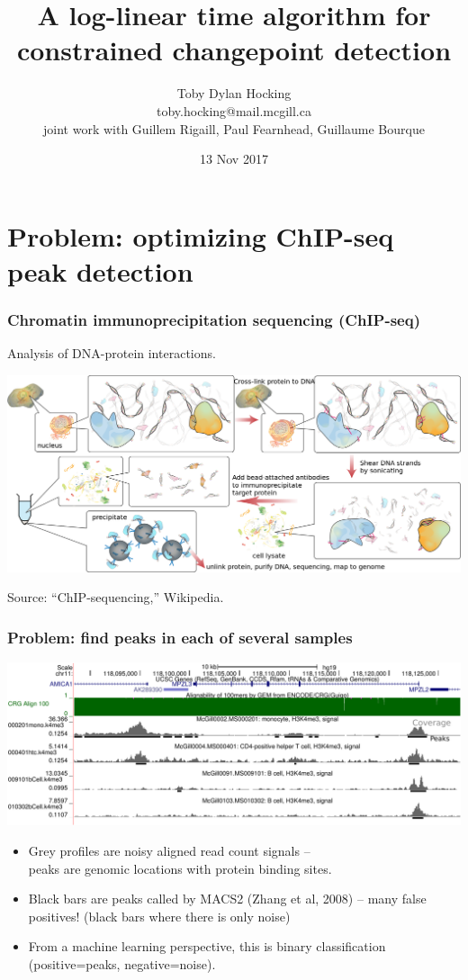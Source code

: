 \documentclass{beamer}
\begin{document}
\title{A log-linear time algorithm for constrained 
changepoint detection
}

\author{
  Toby Dylan Hocking\\
  toby.hocking@mail.mcgill.ca\\
  joint work with Guillem Rigaill, Paul Fearnhead, 
  Guillaume Bourque}

\date{13 Nov 2017}

\maketitle

\section{Problem: optimizing ChIP-seq peak detection}

\begin{frame}
  \frametitle{Chromatin immunoprecipitation sequencing (ChIP-seq)}
  Analysis of DNA-protein interactions.

  \includegraphics[width=\textwidth]{Chromatin_immunoprecipitation_sequencing_wide.png}

  Source: ``ChIP-sequencing,'' Wikipedia.
\end{frame}

\begin{frame}
  \frametitle{Problem: find peaks in each of several samples}
  \includegraphics[width=\textwidth]{screenshot-ucsc-edited}

  \begin{itemize}
  \item Grey profiles are noisy aligned read count signals -- \\peaks
    are genomic locations with protein binding sites.
  \item Black bars are peaks called by MACS2 (Zhang et al, 2008) -- many
    false positives! (black bars where there is only noise)
  \item From a machine learning perspective, this is binary
    classification (positive=peaks, negative=noise).
  \end{itemize}
\end{frame}
\end{document}
